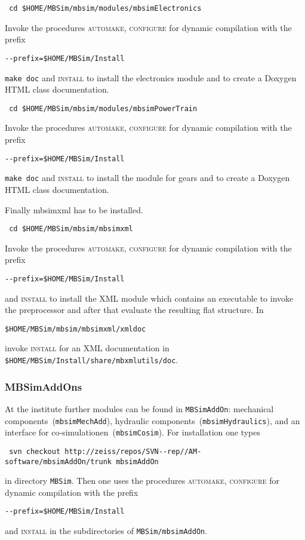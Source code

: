 \begin{verbatim}
 cd $HOME/MBSim/mbsim/modules/mbsimElectronics
\end{verbatim}
Invoke the procedures \textsc{automake, configure} for dynamic compilation with the prefix
\begin{verbatim}
--prefix=$HOME/MBSim/Install
\end{verbatim}
\texttt{make doc} and \textsc{install} to install the electronics module and to create a Doxygen HTML class documentation.\vspace{5mm}
\begin{verbatim}
 cd $HOME/MBSim/mbsim/modules/mbsimPowerTrain
\end{verbatim}
Invoke the procedures \textsc{automake, configure} for dynamic compilation with the prefix
\begin{verbatim}
--prefix=$HOME/MBSim/Install
\end{verbatim}
\texttt{make doc} and \textsc{install} to install the module for gears and to create a Doxygen HTML class documentation.\vspace{5mm} 

Finally mbsimxml has to be installed.
\begin{verbatim}
 cd $HOME/MBSim/mbsim/mbsimxml
\end{verbatim}
Invoke the procedures \textsc{automake, configure} for dynamic compilation with the prefix
\begin{verbatim}
--prefix=$HOME/MBSim/Install
\end{verbatim}
and \textsc{install} to install the XML module which contains an executable to invoke the preprocessor and after that evaluate the resulting flat structure. In
\begin{verbatim}
$HOME/MBSim/mbsim/mbsimxml/xmldoc
\end{verbatim}
invoke \textsc{install} for an XML documentation in \texttt{\$HOME/MBSim/Install/share/mbxmlutils/doc}.

\subsubsection{MBSimAddOns}
At the institute further modules can be found in \texttt{MBSimAddOn}: mechanical components~(\texttt{mbsimMechAdd}), hydraulic components~(\texttt{mbsimHydraulics}), and an interface for co-simulationen~(\texttt{mbsimCosim}). For installation one types
\begin{verbatim}
 svn checkout http://zeiss/repos/SVN--rep//AM-software/mbsimAddOn/trunk mbsimAddOn
\end{verbatim}
in directory \texttt{MBSim}. Then one uses the procedures \textsc{automake, configure} for dynamic compilation with the prefix
\begin{verbatim}
--prefix=$HOME/MBSim/Install
\end{verbatim}
and \textsc{install} in the subdirectories of \texttt{MBSim/mbsimAddOn}.

